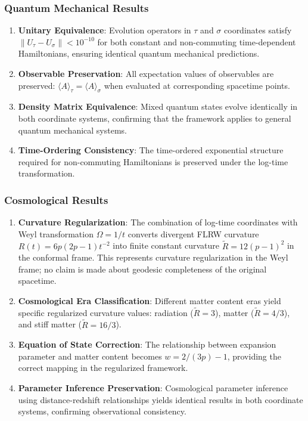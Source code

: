 \subsubsection{Quantum Mechanical Results}

\begin{enumerate}
\item \textbf{Unitary Equivalence}: Evolution operators in $\tau$ and $\sigma$ coordinates satisfy $\|U_\tau - U_\sigma\| < 10^{-10}$ for both constant and non-commuting time-dependent Hamiltonians, ensuring identical quantum mechanical predictions.

\item \textbf{Observable Preservation}: All expectation values of observables are preserved: $\langle A \rangle_\tau = \langle A \rangle_\sigma$ when evaluated at corresponding spacetime points.

\item \textbf{Density Matrix Equivalence}: Mixed quantum states evolve identically in both coordinate systems, confirming that the framework applies to general quantum mechanical systems.

\item \textbf{Time-Ordering Consistency}: The time-ordered exponential structure required for non-commuting Hamiltonians is preserved under the log-time transformation.
\end{enumerate}

\subsubsection{Cosmological Results}

\begin{enumerate}
\item \textbf{Curvature Regularization}: The combination of log-time coordinates with Weyl transformation $\Omega = 1/t$ converts divergent FLRW curvature $R(t) = 6p(2p-1)t^{-2}$ into finite constant curvature $\tilde{R} = 12(p-1)^2$ in the conformal frame. This represents curvature regularization in the Weyl frame; no claim is made about geodesic completeness of the original spacetime.

\item \textbf{Cosmological Era Classification}: Different matter content eras yield specific regularized curvature values: radiation ($\tilde{R} = 3$), matter ($\tilde{R} = 4/3$), and stiff matter ($\tilde{R} = 16/3$).

\item \textbf{Equation of State Correction}: The relationship between expansion parameter and matter content becomes $w = 2/(3p) - 1$, providing the correct mapping in the regularized framework.

\item \textbf{Parameter Inference Preservation}: Cosmological parameter inference using distance-redshift relationships yields identical results in both coordinate systems, confirming observational consistency.
\end{enumerate}

